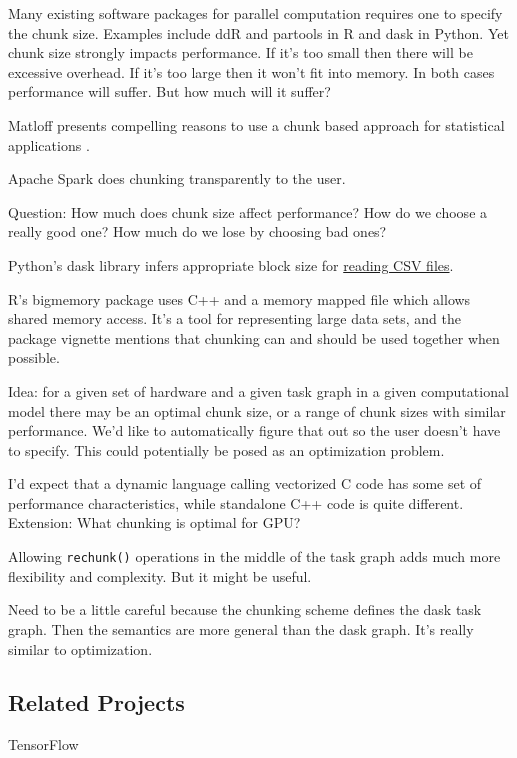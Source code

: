 \documentclass[12pt]{article}
\begin{document}
Many existing software packages for parallel computation requires one to specify the
chunk size. Examples include ddR \cite{R-ddR} and partools
\cite{R-partools} in R and dask in Python.
Yet chunk size strongly impacts
performance. If it's too small then there will be excessive overhead. If
it's too large then it won't fit into memory. In both cases performance
will suffer. But how much will it suffer?

Matloff presents compelling reasons to use a chunk based
approach for statistical applications \cite{matloff2014software}.

Apache Spark does chunking transparently to the user.


Question: How much does chunk size affect performance? How do we choose a
really good one? How much do we lose by choosing bad ones?

Python's dask library infers appropriate block size for
\href{https://github.com/dask/dask/pull/1328}{reading CSV files}.

R's bigmemory package uses C++ and a memory mapped file which allows shared
memory access. \cite{kane2010bigmemory} It's a tool for representing large
data sets, and the package vignette mentions that chunking can and should
be used together when possible.

Idea: for a given set of hardware and a given task graph in a given
computational model there may be
an optimal chunk size, or a range of chunk sizes with similar performance.
We'd like to automatically figure that out so the user doesn't have to
specify. This could potentially be posed as an optimization problem.

I'd expect that a dynamic language calling vectorized C code has some set
of performance characteristics, while standalone C++ code is quite
different.
Extension: What chunking is optimal for GPU?

Allowing \texttt{rechunk()} operations in the middle of the task graph adds
much more flexibility and complexity. But it might be useful.

Need to be a little careful because the chunking scheme defines the dask
task graph. Then the semantics are more general than the dask graph. It's
really similar to optimization.

\subsection{Related Projects}

TensorFlow
\end{document}
